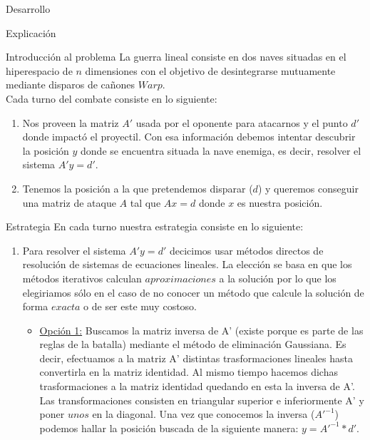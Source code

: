 \begin{section}{Desarrollo}
	\begin{subsection}{Explicación}
		\begin{subsubsection}{Introducción al problema}
			La guerra lineal consiste en dos naves situadas en el hiperespacio de $n$ dimensiones con el objetivo de desintegrarse mutuamente mediante disparos de cañones $Warp$.\\
			
			Cada turno del combate consiste en lo siguiente:
			\begin{enumerate}
			\item Nos proveen la matriz $A'$ usada por el oponente para atacarnos y el punto $d'$ donde impactó el proyectil. Con esa información debemos intentar descubrir la posición $y$ donde se encuentra situada la nave enemiga, es decir, resolver el sistema $A'y=d'$.
					
			\item Tenemos la posición a la que pretendemos disparar ($d$) y queremos conseguir una matriz de ataque $A$ tal que $Ax=d$ donde $x$ es nuestra posición.
			\end{enumerate}
		\end{subsubsection}
		\begin{subsubsection}{Estrategia}
			En cada turno nuestra estrategia consiste en lo siguiente:
			
			\begin{enumerate}
			\item Para resolver el sistema $A'y=d'$ decicimos usar métodos directos de resolución de sistemas de ecuaciones lineales. La elección se basa en que los métodos iterativos calculan $aproximaciones$ a la solución por lo que los elegiriamos sólo en el caso de no conocer un método que calcule la solución de forma $exacta$ o de ser este muy costoso.
				\begin{itemize}
					\item \underline{Opción 1:} Buscamos la matriz inversa de A' (existe porque es parte de las reglas de la batalla) mediante el método de eliminación Gaussiana. Es decir, efectuamos a la matriz A' distintas trasformaciones lineales hasta convertirla en la matriz identidad. Al mismo tiempo hacemos dichas trasformaciones a la matriz identidad quedando en esta la inversa de A'.
					Las transformaciones consisten en triangular superior e inferiormente A' y poner $unos$ en la diagonal.
					Una vez que conocemos la inversa ($A'^{-1}$) podemos hallar la posición buscada de la siguiente manera: $y=A'^{-1}*d'$.\\
					

\end{itemize}
\end{enumerate}
\end{subsubsection}
\end{subsection}
\end{section}
